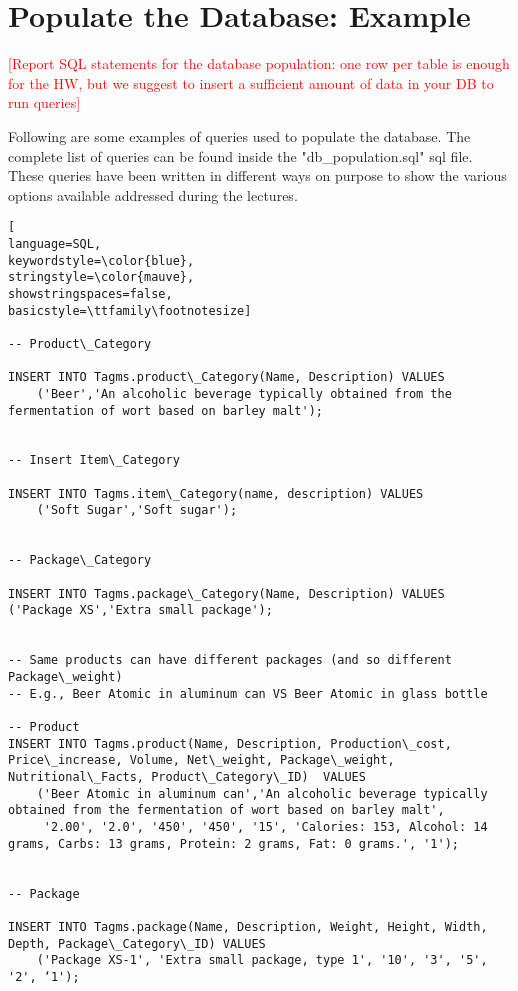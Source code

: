 
\section{Populate the Database: Example}
\textcolor{red}{[Report SQL statements for the database population: one row per table is enough for the HW, but we suggest to insert a sufficient amount of data in your DB to run queries]}

Following are some examples of queries used to populate the database. The complete list of queries can be found inside the "db\_population.sql" sql file. These queries have been written in different ways on purpose to show the various options available addressed during the lectures.


\begin{lstlisting}[
language=SQL,
keywordstyle=\color{blue},
stringstyle=\color{mauve},
showstringspaces=false,
basicstyle=\ttfamily\footnotesize]

-- Product\_Category

INSERT INTO Tagms.product\_Category(Name, Description) VALUES
    ('Beer','An alcoholic beverage typically obtained from the fermentation of wort based on barley malt');


-- Insert Item\_Category

INSERT INTO Tagms.item\_Category(name, description) VALUES
    ('Soft Sugar','Soft sugar');


-- Package\_Category

INSERT INTO Tagms.package\_Category(Name, Description) VALUES ('Package XS','Extra small package');


-- Same products can have different packages (and so different Package\_weight)
-- E.g., Beer Atomic in aluminum can VS Beer Atomic in glass bottle

-- Product
INSERT INTO Tagms.product(Name, Description, Production\_cost, Price\_increase, Volume, Net\_weight, Package\_weight, Nutritional\_Facts, Product\_Category\_ID)  VALUES
    ('Beer Atomic in aluminum can','An alcoholic beverage typically obtained from the fermentation of wort based on barley malt',
     '2.00', '2.0', '450', '450', '15', 'Calories: 153, Alcohol: 14 grams, Carbs: 13 grams, Protein: 2 grams, Fat: 0 grams.', '1');


-- Package

INSERT INTO Tagms.package(Name, Description, Weight, Height, Width, Depth, Package\_Category\_ID) VALUES
    ('Package XS-1', 'Extra small package, type 1', '10', '3', '5', '2', ‘1');



\end{lstlisting}
